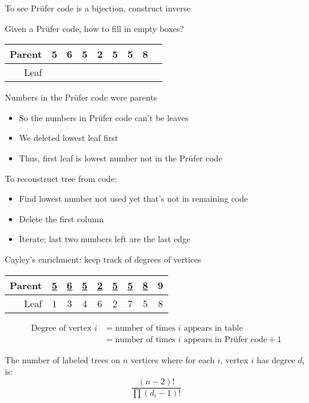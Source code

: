 \documentclass{beamer}
\begin{document}
\begin{frame}{To see Pr\"ufer code is a bijection, construct inverse}
  \begin{block}{Given a Pr\"ufer code, how to fill in empty boxes?}
        \begin{tabular}{r|c|c|c|c|c|c|c|c}
        Parent & 5 & 6 & 5 & 2 & 5 & 5 & 8 &  \\ \hline
        Leaf   &  &  &  &  &  &  &  &  
        \end{tabular}
    \end{block}

\begin{block}{Numbers in the Pr\"ufer code were parents}
  \begin{itemize}
  \item So the numbers in Pr\"ufer code can't be leaves
  \item We deleted lowest leaf first
  \item Thus, first leaf is lowest number not in the Pr\"ufer code
  \end{itemize}
  \end{block}
\begin{block}{To reconstruct tree from code:}
  \begin{itemize}
  \item Find lowest number not used yet that's not in remaining code
  \item Delete the first column
  \item Iterate; last two numbers left are the last edge
    \end{itemize}

\end{block}

\end{frame}

\begin{frame}{Cayley's enrichment: keep track of degrees of vertices}
        \begin{tabular}{r|c|c|c|c|c|c|c|c}

        Parent & \underline{5} & \underline{6} & \underline{5} & \underline{2} & \underline{5} & \underline{5} & \underline{8} & 9 \\ \hline
        Leaf   & 1 & 3 & 4 & 6 & 2 & 7 & 5 & 8 
        \end{tabular}
        \begin{align*}
          \text{Degree of vertex $i$} & = \text{number of times $i$ appears in table} \\
          & = \text{number of times $i$ appears in Pr\"ufer code}+1
        \end{align*}


\begin{corollary}The number of labeled trees on $n$ vertices where for each $i$, vertex $i$ has degree $d_i$ is:
  $$\frac{(n-2)!}{\prod (d_i-1)!}$$
  \end{corollary}

\end{frame}
\end{document}
